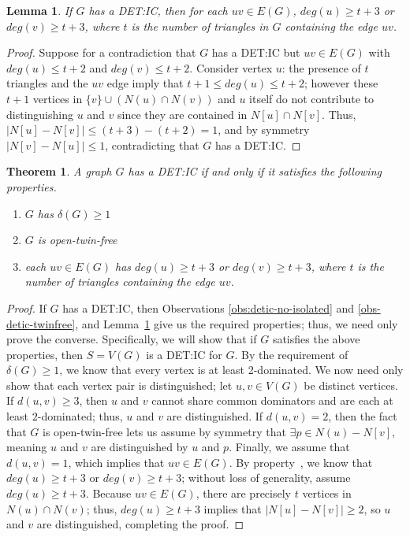 \documentclass{article}
\newtheorem{lemma}{Lemma}[section]
\newtheorem{theorem}{Theorem}[section]
\newcommand{\toroman}[1]{\textit{\expandafter{\romannumeral #1\relax}}}
\begin{document}
\begin{lemma}\label{lemma:triangle-dom}
If $G$ has a DET:IC, then for each $uv \in E(G)$, $deg(u) \ge t + 3$ or $deg(v) \ge t + 3$, where $t$ is the number of triangles in $G$ containing the edge $uv$.
\end{lemma}
\begin{proof}
Suppose for a contradiction that $G$ has a DET:IC but $uv \in E(G)$ with $deg(u) \le t + 2$ and $deg(v) \le t + 2$.
Consider vertex $u$: the presence of $t$ triangles and the $uv$ edge imply that $t + 1 \le deg(u) \le t + 2$; however these $t+1$ vertices in $\{v\} \cup (N(u) \cap N(v))$ and $u$ itself do not contribute to distinguishing $u$ and $v$ since they are contained in $N[u] \cap N[v]$.
Thus, $|N[u] - N[v]| \le (t + 3) - (t + 2) = 1$, and by symmetry $|N[v] - N[u]| \le 1$, contradicting that $G$ has a DET:IC.
\end{proof}

\begin{theorem}\label{theo:detic-exist-alt}
A graph $G$ has a DET:IC if and only if it satisfies the following properties.
\begin{enumerate}[label=\roman*,noitemsep]
    \item $G$ has $\delta(G) \ge 1$
    \item $G$ is open-twin-free
    \item each $uv \in E(G)$ has $deg(u) \ge t + 3$ or $deg(v) \ge t + 3$, where $t$ is the number of triangles containing the edge $uv$.
\end{enumerate}
\end{theorem}
\begin{proof}
If $G$ has a DET:IC, then Observations \ref{obs:detic-no-isolated} and  \ref{obs-detic-twinfree}, and Lemma~\ref{lemma:triangle-dom} give us the required properties; thus, we need only prove the converse.
Specifically, we will show that if $G$ satisfies the above properties, then $S = V(G)$ is a DET:IC for $G$.
By the requirement of $\delta(G) \ge 1$, we know that every vertex is at least 2-dominated.
We now need only show that each vertex pair is distinguished; let $u,v \in V(G)$ be distinct vertices.
If $d(u,v) \ge 3$, then $u$ and $v$ cannot share common dominators and are each at least $2$-dominated; thus, $u$ and $v$ are distinguished.
If $d(u,v) = 2$, then the fact that $G$ is open-twin-free lets us assume by symmetry that $\exists p \in N(u) - N[v]$, meaning $u$ and $v$ are distinguished by $u$ and $p$.
Finally, we assume that $d(u,v) = 1$, which implies that $uv \in E(G)$.
By property~\toroman{3}, we know that $deg(u) \ge t + 3$ or $deg(v) \ge t + 3$; without loss of generality, assume $deg(u) \ge t + 3$.
Because $uv \in E(G)$, there are precisely $t$ vertices in $N(u) \cap N(v)$; thus, $deg(u) \ge t + 3$ implies that $|N[u] - N[v]| \ge 2$, so $u$ and $v$ are distinguished, completing the proof.
\end{proof}
\end{document}
